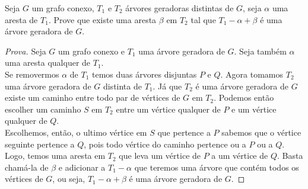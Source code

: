 \documentclass[12pt]{article}
\newenvironment{problem}[2][Ex]{\begin{trivlist}
\item[\hskip \labelsep {\bfseries #1}\hskip \labelsep {\bfseries #2.}]}{\end{trivlist}}
\begin{document}
\begin{problem}{15}
Seja $G$ um grafo conexo, $T_1$ e $T_2$ árvores geradoras distintas de $G$, seja $\alpha$ uma aresta de $T_1$. Prove que existe uma aresta $\beta$ em $T_2$ tal que $T_1 - \alpha + \beta$ é uma árvore geradora de $G$.
\end{problem}

\begin{proof}[Prova]
Seja $G$ um grafo conexo e $T_1$ uma árvore geradora de $G$. Seja também $\alpha$ uma aresta qualquer de $T_1$. \\
Se removermos $\alpha$ de $T_1$ temos duas árvores disjuntas $P$ e $Q$. Agora tomamos $T_2$ uma árvore geradora de $G$ distinta de $T_1$. Já que $T_2$ é uma árvore geradora de $G$ existe um caminho entre todo par de vértices de $G$ em $T_2$. Podemos então escolher um caminho $S$ em $T_2$ entre um vértice qualquer de $P$ e um vértice qualquer de $Q$. \\
Escolhemos, então, o ultimo vértice em $S$ que pertence a $P$ sabemos que o vértice seguinte pertence a $Q$, pois todo vértice do caminho pertence ou a $P$ ou a $Q$. Logo, temos uma aresta em $T_2$ que leva um vértice de $P$ a um vértice de $Q$. Basta chamá-la de $\beta$ e adicionar a $T_1 - \alpha$ que teremos uma árvore que contém todos os vértices de $G$, ou seja, $T_1 - \alpha + \beta$ é uma árvore geradora de $G$.
\end{proof}
\end{document}

